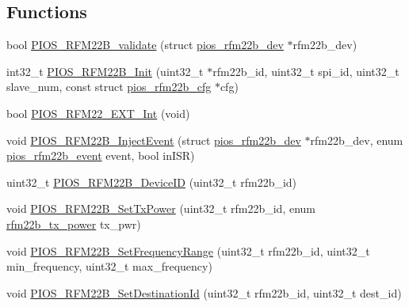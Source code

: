 \subsection*{\-Functions}
\begin{DoxyCompactItemize}
\item 
bool \hyperlink{group___p_i_o_s___r_f_m22_b_gadb74603103aaab46ac72a08665bf0047}{\-P\-I\-O\-S\-\_\-\-R\-F\-M22\-B\-\_\-validate} (struct \hyperlink{structpios__rfm22b__dev}{pios\-\_\-rfm22b\-\_\-dev} $\ast$rfm22b\-\_\-dev)
\item 
int32\-\_\-t \hyperlink{group___p_i_o_s___r_f_m22_b_ga5d053a5a8be93e0b0d4c61061cc74464}{\-P\-I\-O\-S\-\_\-\-R\-F\-M22\-B\-\_\-\-Init} (uint32\-\_\-t $\ast$rfm22b\-\_\-id, uint32\-\_\-t spi\-\_\-id, uint32\-\_\-t slave\-\_\-num, const struct \hyperlink{structpios__rfm22b__cfg}{pios\-\_\-rfm22b\-\_\-cfg} $\ast$cfg)
\item 
bool \hyperlink{group___p_i_o_s___r_f_m22_b_ga34f82a23ad429841e5f212fc0c221131}{\-P\-I\-O\-S\-\_\-\-R\-F\-M22\-\_\-\-E\-X\-T\-\_\-\-Int} (void)
\item 
void \hyperlink{group___p_i_o_s___r_f_m22_b_ga4327e22931b06353b8340bfc91abdc59}{\-P\-I\-O\-S\-\_\-\-R\-F\-M22\-B\-\_\-\-Inject\-Event} (struct \hyperlink{structpios__rfm22b__dev}{pios\-\_\-rfm22b\-\_\-dev} $\ast$rfm22b\-\_\-dev, enum \hyperlink{group___p_i_o_s___r_f_m22_b_gafefba9f85ea9fb8d2c610fe3759a00c2}{pios\-\_\-rfm22b\-\_\-event} event, bool in\-I\-S\-R)
\item 
uint32\-\_\-t \hyperlink{group___p_i_o_s___r_f_m22_b_ga48b5ed8668584cdfbbbec3e07156e5d8}{\-P\-I\-O\-S\-\_\-\-R\-F\-M22\-B\-\_\-\-Device\-I\-D} (uint32\-\_\-t rfm22b\-\_\-id)
\item 
void \hyperlink{group___p_i_o_s___r_f_m22_b_ga2230c70e99a4c87dcad0ea19351ddc0a}{\-P\-I\-O\-S\-\_\-\-R\-F\-M22\-B\-\_\-\-Set\-Tx\-Power} (uint32\-\_\-t rfm22b\-\_\-id, enum \hyperlink{group___p_i_o_s___r_f_m22_b_gaad7a4f0b388c5c9323bb4ced4e9356cc}{rfm22b\-\_\-tx\-\_\-power} tx\-\_\-pwr)
\item 
void \hyperlink{group___p_i_o_s___r_f_m22_b_ga6b7275549a5178f70500c1705d85e30a}{\-P\-I\-O\-S\-\_\-\-R\-F\-M22\-B\-\_\-\-Set\-Frequency\-Range} (uint32\-\_\-t rfm22b\-\_\-id, uint32\-\_\-t min\-\_\-frequency, uint32\-\_\-t max\-\_\-frequency)
\item 
void \hyperlink{group___p_i_o_s___r_f_m22_b_ga2e2954db8900f7f997170fbc5047e748}{\-P\-I\-O\-S\-\_\-\-R\-F\-M22\-B\-\_\-\-Set\-Destination\-Id} (uint32\-\_\-t rfm22b\-\_\-id, uint32\-\_\-t dest\-\_\-id)
\item 

\end{DoxyCompactItemize}
